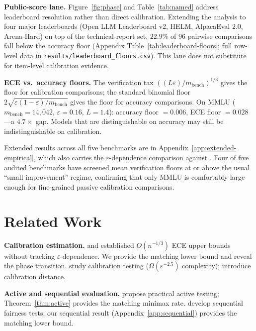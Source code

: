 \documentclass{article}
\newcommand{\Lip}{L}
\newcommand{\errrate}{\varepsilon}
\theoremstyle{definition}
\begin{document}
\textbf{Public-score lane.} Figure~\ref{fig:phase} and Table~\ref{tab:named} address leaderboard resolution rather than direct calibration. Extending the analysis to four major leaderboards (Open LLM Leaderboard v2, HELM, AlpacaEval 2.0, Arena-Hard) on top of the technical-report set, $22.9\%$ of $96$ pairwise comparisons fall below the accuracy floor (Appendix Table~\ref{tab:leaderboard-floors}; full row-level data in \texttt{results/leaderboard\_floors.csv}). This lane does not substitute for item-level calibration evidence.

\textbf{ECE vs.\ accuracy floors.} The verification tax $((\Lip\errrate)/m_{\mathrm{bench}})^{1/3}$ gives the floor for calibration comparisons; the standard binomial floor $2\sqrt{\errrate(1-\errrate)/m_{\mathrm{bench}}}$ gives the floor for accuracy comparisons. On MMLU ($m_{\mathrm{bench}}{=}14{,}042$, $\errrate{=}0.16$, $\Lip{=}1.4$): accuracy floor $= 0.006$, ECE floor $= 0.028$---a $4.7\times$ gap. Models that are distinguishable on accuracy may still be indistinguishable on calibration.

Extended results across all five benchmarks are in Appendix~\ref{app:extended-empirical}, which also carries the $\errrate$-dependence comparison against \citet{sun2023recalibration}. Four of five audited benchmarks have screened mean verification floors at or above the usual ``small improvement'' regime, confirming that only MMLU is comfortably large enough for fine-grained passive calibration comparisons.

\section{Related Work}
\label{sec:related}

\textbf{Calibration estimation.} \citet{sun2023recalibration} and \citet{futami2024information} established $O(n^{-1/3})$ ECE upper bounds without tracking $\errrate$-dependence. We provide the matching lower bound and reveal the phase transition. \citet{hu2024testing} study calibration testing ($\Omega(\errrate^{-2.5})$ complexity); \citet{blasiok2023calibration} introduce calibration distance.

\textbf{Active and sequential evaluation.} \citet{kossen2021active} propose practical active testing; Theorem~\ref{thm:active} provides the matching minimax rate. \citet{shekhar2024fairness} develop sequential fairness tests; our sequential result (Appendix~\ref{app:sequential}) provides the matching lower bound.
\end{document}
